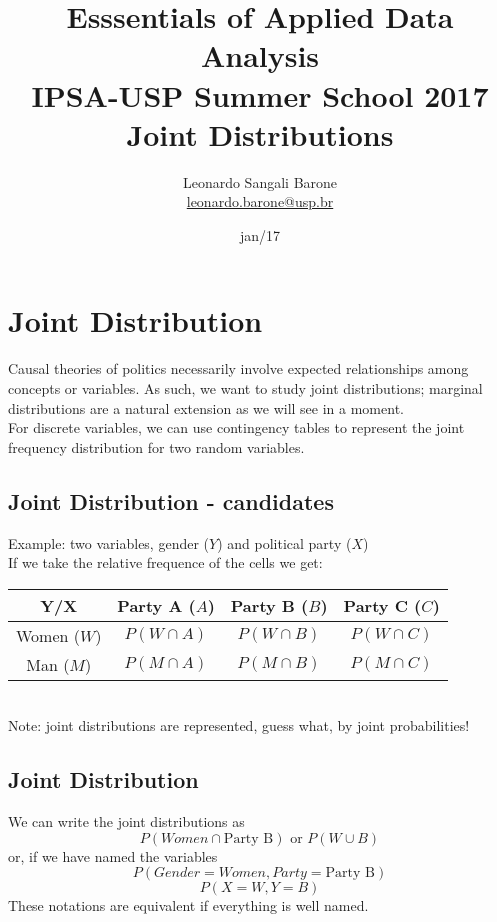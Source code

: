\documentclass[11pt]{article}
\title{\textbf{Esssentials of Applied Data Analysis\\
				IPSA-USP Summer School 2017}\newline\\
				Joint Distributions}
\author{Leonardo Sangali Barone\\ 	\href{leonardo.barone@usp.br}{leonardo.barone@usp.br}}
\date{jan/17}
\begin{document}
\maketitle


\section*{Joint Distribution}

	Causal theories of politics necessarily involve expected relationships among concepts or variables. As such, we want to study joint distributions; marginal distributions are a natural extension as we will see in a moment.
	\newline\\
	For discrete variables, we can use contingency tables to represent the joint frequency distribution for two random variables.


	\subsection*{Joint Distribution - candidates}
	
	Example: two variables, gender ($Y$) and political party ($X$)\\
	If we take the relative frequence of the cells we get:\\

	\begin{tabular}{|c|ccc|}
\hline
	Y/X & Party A ($A$) & Party B ($B$) & Party C ($C$)\\
\hline
	Women ($W$) & $P(W \cap A)$ & $P(W \cap B)$ & $P(W \cap C)$\\
	Man ($M$) & $P(M \cap A)$ & $P(M \cap B)$ & $P(M \cap C)$\\
\hline
\end{tabular}\newline\\
\small{Note: joint distributions are represented, guess what, by joint probabilities!}


	\subsection*{Joint Distribution }
	We can write the joint distributions as \[P(Women \cap \text{Party B}) \text{ or }P(W \cup B)\] or, if we have named the variables \[P(Gender = Women, Party = \text{Party B})\] \[P(X = W, Y = B)\] These notations are equivalent if everything is well named.
\end{document}
